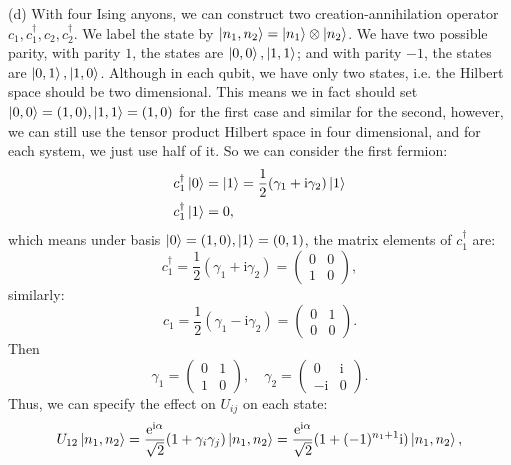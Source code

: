 \documentclass{book}
\begin{document}
(d) With four Ising anyons, we can construct two creation-annihilation operator $c_{1} ,c_{1}^{\dagger } ,c_{2} ,c_{2}^{\dagger }$. We label the state by $\ket{n_{1} ,n_{2}} =\ket{n_{1}} \otimes \ket{n_{2}}$. We have two possible parity, with parity $1$, the states are $\ket{0,0} ,\ket{1,1}$; and with parity $-1$, the states are $\ket{0,1} ,\ket{1,0}$. Although in each qubit, we have only two states, i.e. the Hilbert space should be two dimensional. This means we in fact should set $\ket{0,0} =( 1,0) ,\ket{1,1} =( 1,0)$ for the first case and similar for the second, however, we can still use the tensor product Hilbert space in four dimensional, and for each system, we just use half of it. So we can consider the first fermion:
\begin{equation*}
\begin{aligned}
c_{1}^{\dagger }\ket{0} & =\ket{1} =\frac{1}{2}( \gamma _{1} +\mathrm{i} \gamma _{2})\ket{1}\\
c_{1}^{\dagger }\ket{1} & =0,
\end{aligned}
\end{equation*}
which means under basis $\ket{0} =( 1,0) ,\ket{1} =( 0,1)$, the matrix elements of $c_{1}^{\dagger }$ are:
\begin{equation*}
c_{1}^{\dagger } =\frac{1}{2}( \gamma _{1} +\mathrm{i} \gamma _{2}) =\begin{pmatrix}
0 & 0\\
1 & 0
\end{pmatrix} ,
\end{equation*}
similarly:
\begin{equation*}
c_{1} =\frac{1}{2}( \gamma _{1} -\mathrm{i} \gamma _{2}) =\begin{pmatrix}
0 & 1\\
0 & 0
\end{pmatrix} .
\end{equation*}
Then
\begin{equation*}
\gamma _{1} =\begin{pmatrix}
0 & 1\\
1 & 0
\end{pmatrix} ,\quad \gamma _{2} =\begin{pmatrix}
0 & \mathrm{i}\\
-\mathrm{i} & 0
\end{pmatrix} .
\end{equation*}
Thus, we can specify the effect on $U_{ij}$ on each state:
\begin{equation*}
U_{12}\ket{n_{1} ,n_{2}} =\frac{\mathrm{e}^{\mathrm{i} \alpha }}{\sqrt{2}}( 1+\gamma _{i} \gamma _{j})\ket{n_{1} ,n_{2}} =\frac{\mathrm{e}^{\mathrm{i} \alpha }}{\sqrt{2}} (1+( -1)^{n_{1} +1}\mathrm{i} )\ket{n_{1} ,n_{2}} ,
\end{equation*}
\end{document}
